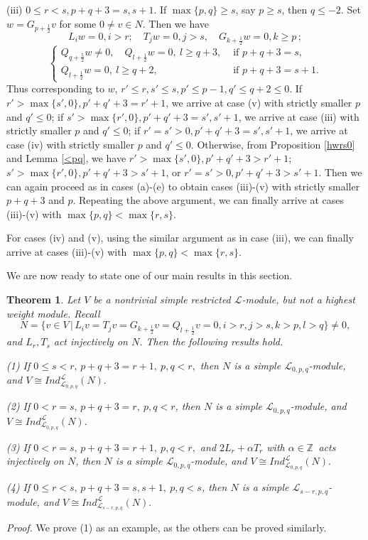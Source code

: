 \documentclass[12pt]{article}
\def\a{\alpha}
\def\ssc{\scriptscriptstyle}
\def\Z{\mathbb{Z}{\ssc\,}}
\numberwithin{equation}{section}
\newtheorem{theo}{Theorem}[section]
\begin{document}
(iii) $0\le r<s, p+q+3=s,s+1$. If  $\max\{p,q\}\ge s$, say $p\ge s$, then $q\le -2$. Set $w=G_{p+\frac{1}{2}}v$ for some $0\ne v\in N$. Then we have
$$ L_iw=0,i>r; \quad T_jw=0, j>s,\quad G_{k+\frac{1}{2}}w=0,k\ge p\,; $$
$$\left\{\begin{array}{rl} Q_{q+\frac{5}{2}}w\ne 0, \quad  Q_{l+\frac{1}{2}}w = 0,\ l\ge q+3,& \mbox{ if } p+q+3=s,\\
 Q_{l+\frac{1}{2}}w= 0,\ l\ge q+2,& \mbox{ if } p+q+3=s+1.\end{array}\right.$$
 Thus corresponding to $w$, $r'\le r, s'\le s,p'\le p-1, q'\le q+2\le 0.$
If $r'>\max\{s',0\}, p'+q'+3=r'+1$, we arrive at case (v) with strictly smaller $p$ and $q'\le 0$; if $s'>\max\{r',0\}, p'+q'+3=s',s'+1$, we arrive at  case (iii) with strictly smaller $p$ and $q'\le 0$; if $r'=s'>0, p'+q'+3=s',s'+1$, we arrive at case (iv) with strictly smaller $p$ and $q'\le 0$. Otherwise, from Proposition \ref{hwrs0} and Lemma \ref{<pq}, we have $r'>\max\{s',0\}, p'+q'+3>r'+1$; $s'>\max\{r',0\}, p'+q'+3>s'+1$, or $r'=s'>0, p'+q'+3>s'+1$. Then we can again proceed  as in  cases (a)-(e) to obtain cases  (iii)-(v) with strictly smaller $p+q+3$ and $p$. Repeating the above argument, we can finally arrive at  cases (iii)-(v) with $\max\{p,q\}< \max\{r,s\}.$

For cases (iv)  and  (v), using the similar argument as in case (iii), we can finally arrive at  cases (iii)-(v) with $\max\{p,q\}< \max\{r,s\}.$




We are now ready to state one of our main results in this section.

\begin{theo}\label{MainTh} Let $V$ be a nontrivial simple restricted  $\mathcal{L}$-module, but  not a highest weight module.
Recall $$N=\{v\in V \,|\,L_iv=T_jv=G_{k+\frac{1}{2}}v=Q_{l+\frac{1}{2}}v=0, i>r,j>s,k>p,l>q\}\ne 0,$$ and  $L_r,T_s$ act injectively on $N$. Then the following results hold.


{\rm (1)} If $0\le s<r,\, p+q+3=r+1,\ p,q<r,$ then $N$ is a simple $\mathcal{L}_{0,p,q}$-module, and $V\cong Ind^{\mathcal{L}}_{\mathcal{L}_{0,p,q}}(N).$

{\rm (2)} If  $0<r=s, \,p+q+3=r, \ p,q<r$, then $N$ is a simple $\mathcal{L}_{0,p,q}$-module, and $V\cong Ind^{\mathcal{L}}_{\mathcal{L}_{0,p,q}}(N).$

{\rm (3)}  If  $0<r=s, \,p+q+3=r+1,\ p,q<r,$  and  $2L_r+\a T_r$ with $\a\in\Z$ acts injectively on $N$, then $N$ is a simple $\mathcal{L}_{0,p,q}$-module, and $V\cong Ind^{\mathcal{L}}_{\mathcal{L}_{0,p,q}}(N).$

{\rm (4)}  If  $0\le r<s,\, p+q+3=s,s+1, \ p,q<s$, then $N$ is a simple $\mathcal{L}_{s-r,p,q}$-module, and $V\cong Ind^{\mathcal{L}}_{\mathcal{L}_{s-r,p,q}}(N).$
\end{theo}
{\it Proof.} We prove (1) as an example, as the others can be proved similarly.
\end{document}
